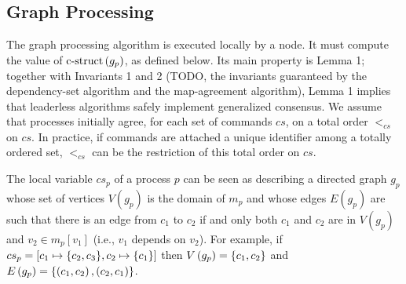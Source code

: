 \subsection{Graph Processing}
\label{graph-proc}

The graph processing algorithm is executed locally by a node. It must compute the value of $\operatorname{c-struct}\left( g_p \right)$, as defined below.
Its main property is Lemma 1; together with Invariants 1 and 2 (TODO, the invariants guaranteed by the dependency-set algorithm and the map-agreement algorithm), Lemma 1 implies that leaderless algorithms safely implement generalized consensus. 
We assume that processes initially agree, for each set of commands $cs$, on a total order $<_{cs}$ on $cs$.
In practice, if commands are attached a unique identifier among a totally ordered set, $<_{cs}$ can be the restriction of this total order on $cs$.

The local variable $cs_p$ of a process $p$ can be seen as describing a directed graph $g_p$ whose set of vertices $V\left( g_p \right)$ is the domain of $m_p$ and whose edges $E\left( g_p \right)$ are such that there is an edge from $c_1$ to $c_2$ if and only both $c_1$ and $c_2$ are in $V\left( g_p \right)$ and $v_2 \in m_p\left[ v_1 \right]$ (i.e., $v_1$ depends on $v_2$). For example, if $cs_p = \left[ c_1 \mapsto \aset{c_2,c_3}, c_2 \mapsto \aset{c_1} \right]$ then $V\left(
g_p \right) = \left\{c_1,c_2\right\}$ and $E\left( g_p \right) = \left\{\left( c_1,c_2 \right),\left( c_2,c_1 \right)\right\}$.

